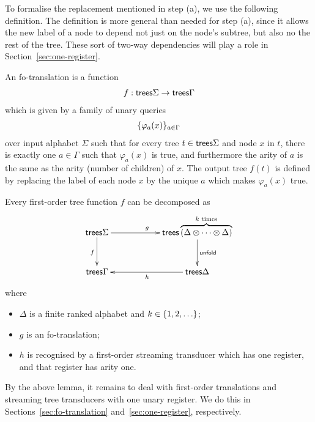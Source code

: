 To formalise the replacement mentioned in step (a), we use the following definition. The definition is more general than needed for step (a), since it allows the new label of a node to depend not just on the node's subtree, but also no the rest of the tree. These sort of two-way dependencies will play a role in Section~\ref{sec:one-register}.


\begin{definition}[Fo translation]
     An fo-translation is a  function
    \begin{align*}
      f :   \mathsf {trees} \Sigma \to \mathsf {trees} \Gamma
    \end{align*}
    which is given by a family of unary queries 
    \begin{align*}
        \{\varphi_a(x)\}_{a \in \Gamma}
    \end{align*}
    over input alphabet $\Sigma$ such that for every tree $t \in \mathsf {trees} \Sigma$ and node $x$ in $t$, there is exactly one $a \in \Gamma$ such that $\varphi_a(x)$ is true, and furthermore the arity of $a$ is the same as the arity (number of children) of $x$.  The output tree $f(t)$ is defined by replacing the label of each node $x$ by the unique $a$ which makes $\varphi_a(x)$ true.
\end{definition}




\begin{lemma}\label{lem:decomposition-of-fo-transductions} Every first-order tree function $f$  can be decomposed as
    \begin{align*}
        \xymatrix@C=2cm{\treesz \Sigma \ar[d]_f \ar[r]^g& \treesz \overbrace{(\Delta \otimes \cdots \otimes \Delta)}^{\text{$k$ times}} \ar[d]^{\mathsf{unfold}} \\   \treesz \Gamma  & \treesz \Delta \ar[l]^h}
    \end{align*}
    where 
    \begin{itemize}
        \item $\Delta$ is a finite ranked alphabet and $k \in \{1,2,\ldots\}$;
        \item $g$ is an fo-translation;
        \item $h$ is recognised by a first-order streaming transducer which has one register, and that register has arity one.
    \end{itemize}
\end{lemma}

By the above lemma, it remains to deal with first-order translations and streaming tree transducers with one unary register. We do this in Sections~\ref{sec:fo-translation} and~\ref{sec:one-register}, respectively.
